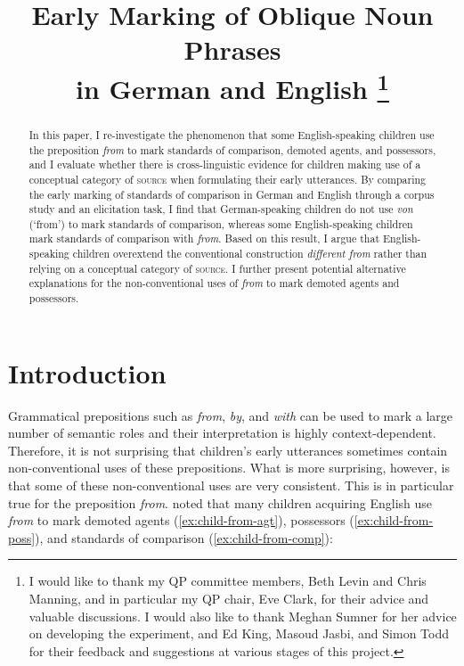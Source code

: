 \documentclass[lucida]{sp} %
\title{Early Marking of Oblique Noun Phrases \\ in German and English
 \thanks{I would like to thank my QP committee members, Beth Levin and Chris Manning, and in particular my QP chair, Eve Clark,  for their advice and valuable discussions. I would also like to thank Meghan Sumner for her advice on developing the experiment, and Ed King, Masoud Jasbi, and Simon Todd for their feedback and suggestions at various stages of this project.}}
\author{%
  \spauthor{Sebastian Schuster\\ \today}
}
\begin{document}

\maketitle

\begin{abstract}

In this paper, I re-investigate the phenomenon that some English-speaking children use the preposition \textit{from} to mark standards of comparison, demoted agents, and possessors, and I evaluate whether there is cross-linguistic evidence for children making use of a conceptual category of \textsc{source} \citep{clark1989a} when formulating their early utterances. By comparing the early marking of standards of comparison in German and English through a corpus study and an elicitation task, I find that German-speaking children do not use \textit{von} (`from') to mark standards of comparison, whereas some English-speaking children mark standards of comparison with \textit{from}. Based on this result, I argue that English-speaking children overextend the conventional construction \textit{different from} rather than relying on a conceptual category of \textsc{source}.  I further present potential alternative explanations for the non-conventional uses of \textit{from} to mark demoted agents and possessors. 
\end{abstract}



\section{Introduction}

Grammatical prepositions such as  \textit{from}, \textit{by}, and \textit{with} can be used to mark a large number of semantic roles and their interpretation is highly context-dependent. Therefore, it is not surprising that children's early utterances sometimes contain non-conventional uses of these prepositions. What is more surprising, however, is that some of these non-conventional uses are very consistent. This is in particular true for the preposition \textit{from}. \cite{clark1989a} noted that many children acquiring English use \textit{from} to mark demoted agents (\ref{ex:child-from-agt}), possessors (\ref{ex:child-from-poss}), and standards of comparison (\ref{ex:child-from-comp}):
\end{document}
